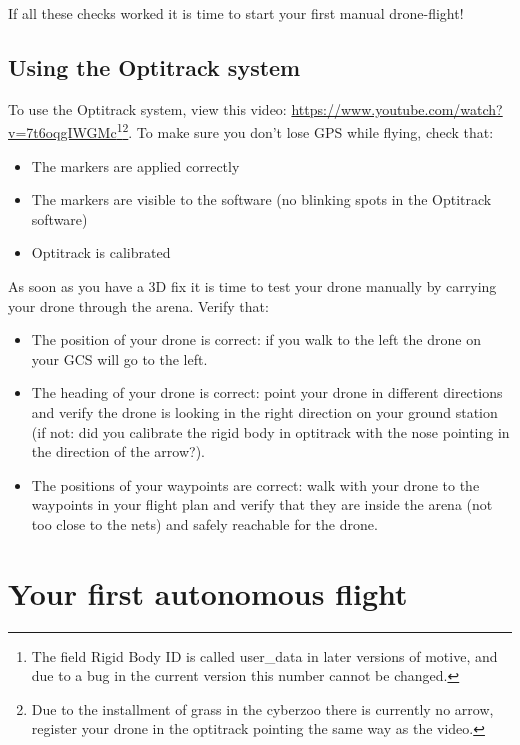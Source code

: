 \documentclass{article}
\begin{document}
If all these checks worked it is time to start your first manual drone-flight! 

\subsection*{Using the Optitrack system}
To use the Optitrack system, view this video: \url{https://www.youtube.com/watch?v=7t6oqgIWGMc}\footnote{The field Rigid Body ID is called user\_data in later versions of motive, and due to a bug in the current version this number cannot be changed.}\footnote{Due to the installment of grass in the cyberzoo there is currently no arrow, register your drone in the optitrack pointing the same way as the video.}.
To make sure you don't lose GPS while flying, check that:
\begin{itemize}
\item The markers are applied correctly 
\item The markers are visible to the software (no blinking spots in the Optitrack software)
\item Optitrack is calibrated
\end{itemize}

As soon as you have a 3D fix it is time to test your drone manually by carrying your drone through the arena. Verify that:
\begin{itemize}
\item The position of your drone is correct: if you walk to the left the drone on your GCS will go to the left.
\item The heading of your drone is correct: point your drone in different directions and verify the drone is looking in the right direction on your ground station (if not: did you calibrate the rigid body in optitrack with the nose pointing in the direction of the arrow?). 
\item The positions of your waypoints are correct: walk with your drone to the waypoints in your flight plan and verify that they are inside the arena (not too close to the nets) and safely reachable for the drone. 
\end{itemize}


\section*{Your first autonomous flight}
\end{document}
